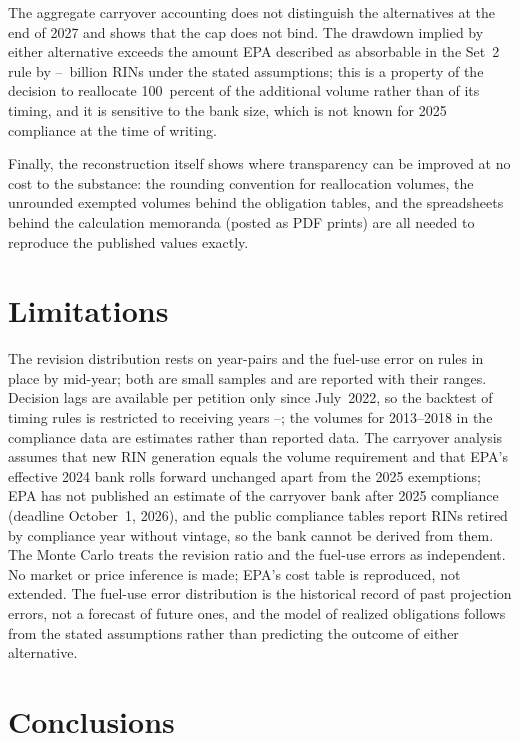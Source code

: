 \documentclass[preprint,12pt,authoryear]{elsarticle}
\begin{document}
The aggregate carryover accounting does not distinguish the alternatives at the end of 2027 and shows that the cap does not bind. The drawdown implied by either alternative exceeds the amount EPA described as absorbable in the Set~2 rule by \valdrawdownExcessOverAbsorbableEqual{}--\valdrawdownExcessOverAbsorbableAllSecond{}~billion RINs under the stated assumptions; this is a property of the decision to reallocate 100~percent of the additional volume rather than of its timing, and it is sensitive to the bank size, which is not known for 2025 compliance at the time of writing.

Finally, the reconstruction itself shows where transparency can be improved at no cost to the substance: the rounding convention for reallocation volumes, the unrounded exempted volumes behind the obligation tables, and the spreadsheets behind the calculation memoranda (posted as PDF prints) are all needed to reproduce the published values exactly.

\section{Limitations}

The revision distribution rests on \valnRevisionPairs{} year-pairs and the fuel-use error on \valnFuelErrorsProspective{} rules in place by mid-year; both are small samples and are reported with their ranges. Decision lags are available per petition only since July~2022, so the backtest of timing rules is restricted to receiving years \valbtFirstTargetYear{}--\valbtLastTargetYear{}; the volumes for 2013--2018 in the compliance data are estimates rather than reported data. The carryover analysis assumes that new RIN generation equals the volume requirement and that EPA's effective 2024 bank rolls forward unchanged apart from the 2025 exemptions; EPA has not published an estimate of the carryover bank after 2025 compliance (deadline October~1, 2026), and the public compliance tables report RINs retired by compliance year without vintage, so the bank cannot be derived from them. The Monte Carlo treats the revision ratio and the fuel-use errors as independent. No market or price inference is made; EPA's cost table is reproduced, not extended. The fuel-use error distribution is the historical record of past projection errors, not a forecast of future ones, and the model of realized obligations follows from the stated assumptions rather than predicting the outcome of either alternative.

\section{Conclusions}
\end{document}
